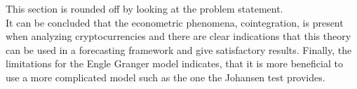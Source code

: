 \noindent This section is rounded off by looking at the problem statement.\\
\noindent It can be concluded that the econometric phenomena, cointegration, is present when analyzing cryptocurrencies and there are clear indications that this theory can be used in a forecasting framework and give satisfactory results. Finally, the limitations for the Engle Granger model indicates, that it is more beneficial to use a more complicated model such as the one the Johansen test provides.